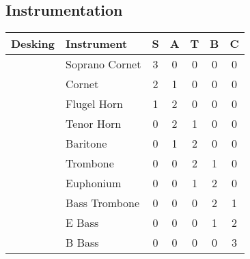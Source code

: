 \documentclass[a5paper]{article}
\newcommand{\tsqw}{%
\raisebox{-0.75ex}{\tikz{\node[draw, fill=white, inner sep=1.5ex] {};}}
}
\begin{document}
\begin{center}
\section*{Instrumentation}
\begin{tabular}{ccc | l | ccccc}\toprule
\multicolumn{3}{c|}{Desking} & Instrument & S & A & T & B & C \\ \midrule
& & \tsqw & Soprano Cornet & 3 & 0 & 0 & 0 & 0 \\[0.5ex]
\tsqw & \tsqw & \tsqw & Cornet & 2 & 1 & 0 & 0 & 0 \\[0.5ex]
& & \tsqw & Flugel Horn & 1 & 2 & 0 & 0 & 0 \\[0.5ex]
\tsqw & \tsqw & \tsqw & Tenor Horn & 0 & 2 & 1 & 0 & 0 \\[0.5ex]
& \tsqw & \tsqw & Baritone & 0 & 1 & 2 & 0 & 0 \\[0.5ex]
& \tsqw & \tsqw & Trombone & 0 & 0 & 2 & 1 & 0 \\[0.5ex]
& \tsqw & \tsqw & Euphonium & 0 & 0 & 1 & 2 & 0 \\[0.5ex]
& & \tsqw & Bass Trombone & 0 & 0 & 0 & 2 & 1 \\[0.5ex]
& \tsqw & \tsqw & E\myflat{} Bass & 0 & 0 & 0 & 1 & 2 \\[0.5ex]
& & \tsqw & B\myflat{} Bass & 0 & 0 & 0 & 0 & 3 \\ \bottomrule%
\end{tabular}

%


\end{center}
\end{document}
